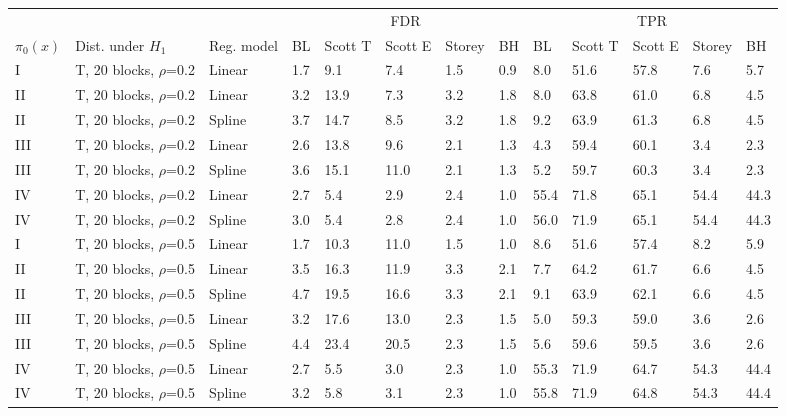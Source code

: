\documentclass{article}\usepackage[]{graphicx}\usepackage[]{color}
\begin{document}
\begin{table}[ht]
\centering
\begin{tabular}{lll|lllll|lllll}
  \hline
  &&& \multicolumn{5}{c}{FDR} & \multicolumn{5}{c}{TPR}\\
 $\pi_0(x)$ &  Dist. under $H_1$ & Reg. model & BL & Scott T & Scott E & Storey & BH & BL & Scott T & Scott E & Storey & BH    \\
 \hline
I & T, 20 blocks, $\rho$=0.2 & Linear & 1.7 & 9.1 & 7.4 & 1.5 & 0.9 & 8.0 & 51.6 & 57.8 & 7.6 & 5.7 \\ 
  II & T, 20 blocks, $\rho$=0.2 & Linear & 3.2 & 13.9 & 7.3 & 3.2 & 1.8 & 8.0 & 63.8 & 61.0 & 6.8 & 4.5 \\ 
  II & T, 20 blocks, $\rho$=0.2 & Spline & 3.7 & 14.7 & 8.5 & 3.2 & 1.8 & 9.2 & 63.9 & 61.3 & 6.8 & 4.5 \\ 
  III & T, 20 blocks, $\rho$=0.2 & Linear & 2.6 & 13.8 & 9.6 & 2.1 & 1.3 & 4.3 & 59.4 & 60.1 & 3.4 & 2.3 \\ 
  III & T, 20 blocks, $\rho$=0.2 & Spline & 3.6 & 15.1 & 11.0 & 2.1 & 1.3 & 5.2 & 59.7 & 60.3 & 3.4 & 2.3 \\ 
  IV & T, 20 blocks, $\rho$=0.2 & Linear & 2.7 & 5.4 & 2.9 & 2.4 & 1.0 & 55.4 & 71.8 & 65.1 & 54.4 & 44.3 \\ 
  IV & T, 20 blocks, $\rho$=0.2 & Spline & 3.0 & 5.4 & 2.8 & 2.4 & 1.0 & 56.0 & 71.9 & 65.1 & 54.4 & 44.3 \\ 
   \hline
I & T, 20 blocks, $\rho$=0.5 & Linear & 1.7 & 10.3 & 11.0 & 1.5 & 1.0 & 8.6 & 51.6 & 57.4 & 8.2 & 5.9 \\ 
  II & T, 20 blocks, $\rho$=0.5 & Linear & 3.5 & 16.3 & 11.9 & 3.3 & 2.1 & 7.7 & 64.2 & 61.7 & 6.6 & 4.5 \\ 
  II & T, 20 blocks, $\rho$=0.5 & Spline & 4.7 & 19.5 & 16.6 & 3.3 & 2.1 & 9.1 & 63.9 & 62.1 & 6.6 & 4.5 \\ 
  III & T, 20 blocks, $\rho$=0.5 & Linear & 3.2 & 17.6 & 13.0 & 2.3 & 1.5 & 5.0 & 59.3 & 59.0 & 3.6 & 2.6 \\ 
  III & T, 20 blocks, $\rho$=0.5 & Spline & 4.4 & 23.4 & 20.5 & 2.3 & 1.5 & 5.6 & 59.6 & 59.5 & 3.6 & 2.6 \\ 
  IV & T, 20 blocks, $\rho$=0.5 & Linear & 2.7 & 5.5 & 3.0 & 2.3 & 1.0 & 55.3 & 71.9 & 64.7 & 54.3 & 44.4 \\ 
  IV & T, 20 blocks, $\rho$=0.5 & Spline & 3.2 & 5.8 & 3.1 & 2.3 & 1.0 & 55.8 & 71.9 & 64.8 & 54.3 & 44.4 \\ 

\end{tabular}
\end{table}
\end{document}
